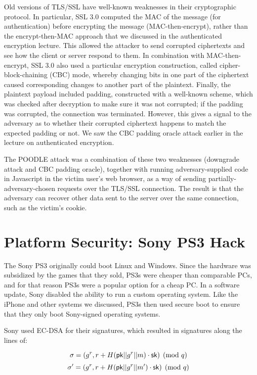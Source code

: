 Old versions of TLS/SSL have well-known weaknesses in their cryptographic
protocol.  In particular, SSL 3.0 computed the MAC of the message
(for authentication) before encrypting the message (MAC-then-encrypt),
rather than the encrypt-then-MAC approach that we discussed in the
authenticated encryption lecture.  This allowed the attacker to send
corrupted ciphertexts and see how the client or server respond to them.
In combination with MAC-then-encrypt, SSL 3.0 also used a particular
encryption construction, called cipher-block-chaining (CBC) mode, whereby
changing bits in one part of the ciphertext caused corresponding changes
to another part of the plaintext.  Finally, the plaintext payload included
padding, constructed with a well-known scheme, which was checked after
decryption to make sure it was not corrupted; if the padding was corrupted,
the connection was terminated.  However, this gives a signal to the adversary
as to whether their corrupted ciphertext happens to match the expected padding
or not.  We saw the CBC padding oracle attack earlier in the lecture on
authenticated encryption.

The POODLE attack was a combination of these two weaknesses (downgrade
attack and CBC padding oracle), together with running adversary-supplied
code in Javascript in the victim user's web browser, as a way of sending
partially-adversary-chosen requests over the TLS/SSL connection.
The result is that the adversary can recover other data sent to the
server over the same connection, such as the victim's cookie.

\section{Platform Security: Sony PS3 Hack}

The Sony PS3 originally could boot Linux and Windows. Since the hardware was subsidized by the games that they sold, PS3s were cheaper than comparable PCs, and for that reason PS3s were a popular option for a cheap PC. In a software update, Sony disabled the ability to run a custom operating system. Like the iPhone and other systems we discussed, PS3s then used secure boot to ensure that they only boot Sony-signed operating systems. 

Sony used EC-DSA for their signatures, which resulted in signatures along the lines of:

\[ \sigma = (g^r, r + H(\mathsf{pk} || g^r || m)\cdot {\ensuremath{\mathsf{sk}}}) \pmod{q} \]
\[ \sigma' = (g^r, r + H(\mathsf{pk} || g^r || m')\cdot {\ensuremath{\mathsf{sk}}}) \pmod{q} \]

